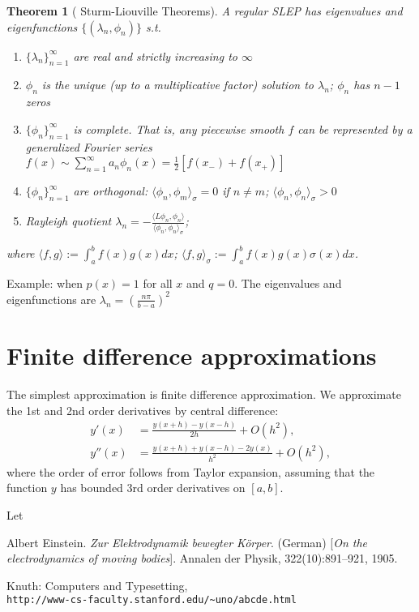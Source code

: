 \documentclass[12pt]{article}
\newcommand{\innerp}[1]{\langle{#1}\rangle}
\newtheorem{theorem}{Theorem}
\begin{document}
\begin{theorem}[ Sturm-Liouville Theorems] A regular SLEP has eigenvalues and eigenfunctions $\{(\lambda_n,\phi_n)\}$ s.t.~
\begin{enumerate}
\item[1-2] $\{\lambda_n\}_{n=1}^\infty$ are real and strictly increasing to $\infty$
\item[3] $\phi_n$ is the unique (up to a multiplicative factor) solution to $\lambda_n$; 
        $\phi_n$ has $n-1$ zeros
\item[4] $\{\phi_n\}_{n=1}^\infty$ is complete. That is, any piecewise smooth $f$ can be represented by a generalized Fourier series  
$ f(x) \sim \sum_{n=1}^\infty a_n \phi_n(x) =\frac{1}{2}[f(x_-)+f(x_+)]$  
\item[5] $\{\phi_n\}_{n=1}^\infty$  are orthogonal: $\innerp{\phi_n,\phi_m}_\sigma= 0$ if $n\neq m$; $\innerp{\phi_n,\phi_n}_\sigma>0$ \
\item[6] Rayleigh quotient   $\lambda_n= -\frac{\innerp{L\phi_n,\phi_n}}{\innerp{\phi_n,\phi_n}_\sigma }$;  \quad 
\end{enumerate}
where $ \innerp{f,g} := \int_a^bf(x)g(x) dx $; \quad$ \innerp{f,g}_\sigma := \int_a^bf(x)g(x)  \sigma(x) dx$.
\end{theorem}


\bigskip
Example: when $p(x)=1$ for all $x$ and $q=0$. The eigenvalues and eigenfunctions are $\lambda_n = (\frac{n\pi }{b-a})^2$
\section{Finite difference approximations}
The simplest approximation is finite difference approximation. We approximate the 1st and 2nd order derivatives by central difference: 
\begin{align*}
y'(x) & = \frac{y(x+h) - y(x-h)}{2h} + O(h^2), \\
y''(x) & = \frac{y(x+h) + y(x-h) - 2y(x)}{h^2} + O(h^2),
\end{align*}
where the order of error follows from Taylor expansion, assuming that the function $y$ has bounded 3rd order derivatives on $[a,b]$. 

Let 


% 
%

\begin{thebibliography}{9}
Albert Einstein. 
\textit{Zur Elektrodynamik bewegter K{\"o}rper}. (German) 
[\textit{On the electrodynamics of moving bodies}]. 
Annalen der Physik, 322(10):891–921, 1905.

Knuth: Computers and Typesetting,
\\\texttt{http://www-cs-faculty.stanford.edu/\~{}uno/abcde.html}
\end{thebibliography}
\end{document}
